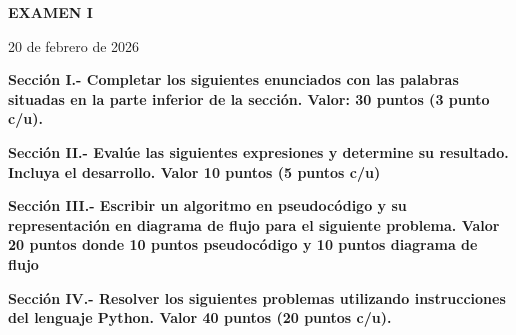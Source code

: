 \documentclass[10pt,addpoints]{exam}
\begin{document}
\begin{center}
  \sffamily\textbf{EXAMEN I}
\end{center}
\begin{flushright}
20 de febrero de 2026
\end{flushright}

\begin{questions}
\begin{EnvFullwidth}
  \sffamily\textbf{Sección I.- Completar los siguientes enunciados con las
  palabras situadas en la parte inferior de la sección. Valor: 30 puntos
  (3 punto c/u).}
\end{EnvFullwidth}













\end{questions}

\begin{questions}
\begin{EnvFullwidth}
  \sffamily\textbf{Sección II.- Evalúe las siguientes expresiones y
  determine su resultado. Incluya el desarrollo. Valor 10 puntos (5 puntos
  c/u)}
\end{EnvFullwidth}





\end{questions}

\newpage

\begin{questions}
\begin{EnvFullwidth}
  \sffamily\textbf{Sección III.- Escribir un algoritmo en pseudocódigo y su
  representación en diagrama de flujo para el siguiente
  problema. Valor 20 puntos donde 10 puntos pseudocódigo y 10 puntos
  diagrama de flujo}
\end{EnvFullwidth}


%
%

\end{questions}

\begin{questions}
\begin{EnvFullwidth}
  \sffamily\textbf{Sección IV.- Resolver los siguientes problemas utilizando
  instrucciones del lenguaje Python. Valor 40 puntos (20 puntos c/u).}
\end{EnvFullwidth}



%

\end{questions}
\end{document}
